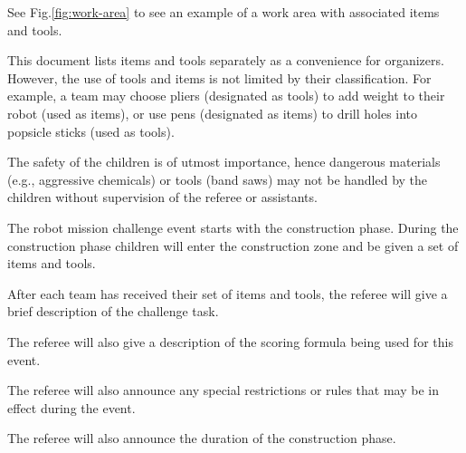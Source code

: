 \documentclass[12pt]{hurocup}
\begin{document}
\begin{decisions}
  See Fig.\ref{fig:work-area} to see an example of a work area with
  associated items and tools.

\item This document lists items and tools separately as a convenience
  for organizers. However, the use of tools and items is not limited
  by their classification. For example, a team may choose pliers
  (designated as tools) to add weight to their robot (used as items),
  or use pens (designated as items) to drill holes into popsicle
  sticks (used as tools).

\item The safety of the children is of utmost importance, hence
  dangerous materials (e.g., aggressive chemicals) or tools (band
  saws) may not be handled by the children without supervision of the
  referee or assistants.

\end{decisions}

\label{law-game-play}

\begin{lawlist}[JC]

\item The robot mission challenge event starts with the construction
  phase. During the construction phase children will enter the
  construction zone and be given a set of items and tools.

\item \label{g-task} After each team has received their set of items
  and tools, the referee will give a brief description of the
  challenge task.

\item \label{g-score} The referee will also give a description of the
  scoring formula being used for this event.

\item \label{g-rule} The referee will also announce any special
  restrictions or rules that may be in effect during the event.

\item \label{g-duration} The referee will also announce the duration
  of the construction phase.

\end{lawlist}
\end{document}
